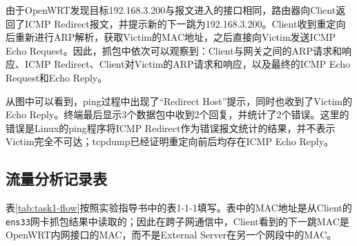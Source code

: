 由于OpenWRT发现目标192.168.3.200与报文进入的接口相同，路由器向Client返回了ICMP Redirect报文，并提示新的下一跳为192.168.3.200。Client收到重定向后重新进行ARP解析，获取Victim的MAC地址，之后直接向Victim发送ICMP Echo Request。因此，抓包中依次可以观察到：Client与网关之间的ARP请求和响应、ICMP Redirect、Client对Victim的ARP请求和响应，以及最终的ICMP Echo Request和Echo Reply。


从图中可以看到，ping过程中出现了“Redirect Host”提示，同时也收到了Victim的Echo Reply。终端最后显示3个数据包中收到2个回复，并统计了2个错误。这里的错误是Linux的ping程序将ICMP Redirect作为错误报文统计的结果，并不表示Victim完全不可达；tcpdump已经证明重定向前后均存在ICMP Echo Reply。

\subsection{流量分析记录表}

表\ref{tab:task1-flow}按照实验指导书中的表1-1-1填写。表中的MAC地址是从Client的\texttt{ens33}网卡抓包结果中读取的；因此在跨子网通信中，Client看到的下一跳MAC是OpenWRT内网接口的MAC，而不是External Server在另一个网段中的MAC。

